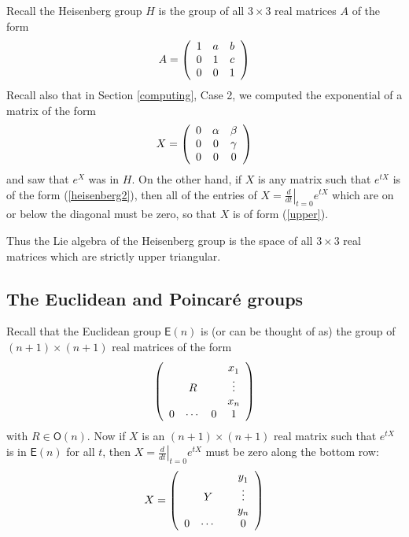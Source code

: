 \documentclass[12pt]{amsbook}
\theoremstyle{plain}
\numberwithin{equation}{chapter}
\numberwithin{theorem}{chapter}
\begin{document}
Recall the Heisenberg group $H$ is the group of all $3\times3$ real matrices
$A$ of the form
\begin{equation}
A=\left(
\begin{array}
[c]{ccc}%
1 & a & b\\
0 & 1 & c\\
0 & 0 & 1
\end{array}
\right)  \label{heisenberg2}%
\end{equation}
Recall also that in Section \ref{computing}, Case 2, we computed the
exponential of a matrix of the form
\begin{equation}
X=\left(
\begin{array}
[c]{ccc}%
0 & \alpha & \beta\\
0 & 0 & \gamma\\
0 & 0 & 0
\end{array}
\right)  \label{upper}%
\end{equation}
and saw that $e^{X}$ was in $H$. On the other hand, if $X$ is any matrix such
that $e^{tX}$ is of the form (\ref{heisenberg2}), then all of the entries of
$X=\left.  \tfrac{d}{dt}\right|  _{t=0}e^{tX}$ which are on or below the
diagonal must be zero, so that $X$ is of form (\ref{upper}).

Thus the Lie algebra of the Heisenberg group is the space of all $3\times3$
real matrices which are strictly upper triangular.

\subsection{The Euclidean and Poincar\'{e} groups}

Recall that the Euclidean group $\mathsf{E}(n)$ is (or can be thought of as)
the group of $(n+1)\times(n+1)$ real matrices of the form
\[
\left(
\begin{array}
[c]{cccc}%
&  &  & x_{1}^{{}}\\
& R &  & \vdots\\
&  &  &  x_{n}\\
0 & \cdots & 0 & 1
\end{array}
\right)
\]
with $R\in\mathsf{O}(n)$. Now if $X$ is an $(n+1)\times(n+1)$ real matrix such
that $e^{tX}$ is in $\mathsf{E}(n)$ for all $t$, then $X=\left.  \frac{d}%
{dt}\right|  _{t=0}e^{tX}$ must be zero along the bottom row:
\begin{equation}
X=\left(
\begin{array}
[c]{cccc}%
&  &  & y_{1}^{{}}\\
& Y &  & \vdots\\
&  &  &  y_{n}\\
0 & \cdots &  & 0
\end{array}
\right) \label{euclid.al}%
\end{equation}
\end{document}
